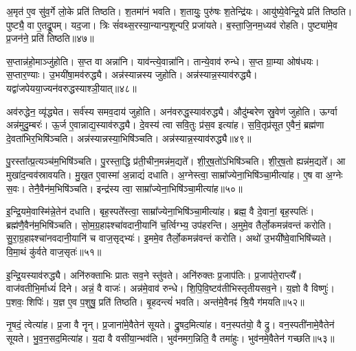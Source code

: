 अ॒मृत॑ ए॒व सु॑व॒र्गे लो॒के प्रति॑ तिष्ठति।
श॒तमा॑नं भवति।
श॒तायुः॒ पुरु॑षः श॒तेन्द्रि॑यः।
आयु॑ष्ये॒वेन्द्रि॒ये प्रति॑ तिष्ठति।
पुष्ट्यै॒ वा ए॒तद्रू॒पम्।
यद॒जा।
त्रिः सं॑वथ्स॒रस्या॒न्यान्प॒शून्परि॒ प्रजा॑यते।
ब॒स्ता॒जि॒नम॒ध्यव॑ रोहति।
पुष्ट्या॑मे॒व प्र॒जन॑ने॒ प्रति॑ तिष्ठति॥४७॥\ip\anuvakamend[प॒रि॒धा॒पय॑ति गो॒धूमा॑ जुहोति॒ स्वं नैति॑ प्र॒त्यञ्चं᳚ घ्नन्ति लो॒को नव॑ च]

स॒प्तान्न॑हो॒माञ्जु॑होति।
स॒प्त वा अन्ना॑नि।
याव॑न्त्ये॒वान्ना॑नि।
तान्ये॒वाव॑ रुन्धे।
स॒प्त ग्रा॒म्या ओष॑धयः।
स॒प्तार॒ण्याः।
उ॒भयी॑षा॒मव॑रुद्ध्यै।
अन्न॑स्यान्नस्य जुहोति।
अन्न॑स्यान्न॒स्या\-व॑रुद्ध्यै।
यद्वा॑जपेयया॒ज्यन॑वरुद्धस्याश्ञी॒यात्॥४८॥\ip

अव॑रुद्धेन॒ व्यृ॑द्ध्येत।
सर्व॑स्य समव॒दाय॑ जुहोति।
अन॑वरुद्ध॒स्या\-व॑\-रुद्ध्यै।
औदु॑म्बरेण स्रु॒वेण॑ जुहोति।
ऊर्ग्वा अन्न॑मुदु॒म्बरः॑।
ऊ॒र्ज ए॒वान्नाद्य॒स्या\-व॑\-रुद्ध्यै।
दे॒वस्य॑ त्वा सवि॒तुः प्र॑स॒व इत्या॑ह।
स॒वि॒तृप्र॑सूत ए॒वैनं॒ ब्रह्म॑णा दे॒वता॑भिर॒भिषि॑ञ्चति।
अन्न॑स्यान्नस्या॒भिषि॑ञ्चति।
अन्न॑स्यान्न॒स्या\-व॑\-रुद्ध्यै॥४९॥\ip

पु॒रस्ता᳚त्प्र॒त्यञ्च॑म॒भिषि॑ञ्चति।
पु॒रस्ता॒द्धि प्र॑ती॒चीन॒मन्न॑म॒द्यते᳚।
शी॒र्॒ष॒तो॑\-ऽभिषि॑ञ्चति।
शी॒र्॒ष॒तो ह्यन्न॑म॒द्यते᳚।
आ मुखा॑द॒न्वव॑\-स्रावयति।
मु॒ख॒त ए॒वास्मा॑ अ॒न्नाद्यं॑ दधाति।
अ॒ग्नेस्त्वा॒ साम्रा᳚ज्येना॒\-भिषि॑ञ्चा॒मी\-त्या॑ह।
ए॒ष वा अ॒ग्नेः स॒वः।
तेनै॒वैन॑म॒भि\-षि॑ञ्चति।
इन्द्र॑स्य त्वा॒ साम्रा᳚ज्येना॒\-भिषि॑ञ्चा॒मी\-त्या॑ह॥५०॥\ip

इ॒न्द्रि॒यमे॒वास्मि॑न्ने॒तेन॑ दधाति।
बृह॒स्पते᳚स्त्वा॒ साम्रा᳚ज्येना॒भि\-षि॑ञ्चा॒मीत्या॑ह।
ब्रह्म॒ वै दे॒वानां॒ बृह॒स्पतिः॑।
ब्रह्म॑णै॒वैन॑म॒भि\-षि॑ञ्चति।
सो॒म॒ग्र॒हाꣴश्चा॑वदानी॒यानि॑ च॒र्त्विग्भ्य॒ उप॑हरन्ति।
अ॒मुमे॒व तैर्लो॒कमन्न॑वन्तं करोति।
सु॒रा॒ग्र॒हाꣴश्चा॑नवदानी॒\-यानि॑ च वाज॒सृद्भ्यः॑।
इ॒ममे॒व तैर्लो॒कमन्न॑वन्तं करोति।
अथो॑ उ॒भयी᳚ष्वे॒वाभिषि॑च्यते।
वि॒मा॒थं कु॑र्वते वाज॒सृतः॑॥५१॥\ip

इ॒न्द्रि॒यस्या\-व॑\-रुद्ध्यै।
अनि॑रुक्ताभिः प्रातः सव॒ने स्तु॑वते।
अनि॑रुक्तः प्र॒जा\-प॑तिः।
प्र॒जा\-प॑ते॒राप्त्यै᳚।
वाज॑वतीभि॒र्माध्यं॑ दिने।
अन्नं॒ वै वाजः॑।
अन्न॑मे॒वाव॑ रुन्धे।
शि॒पि॒वि॒ष्ट\-व॑तीभिस्तृतीयसव॒ने।
य॒ज्ञो वै विष्णुः॑।
प॒शवः॒ शिपिः॑।
य॒ज्ञ ए॒व प॒शुषु॒ प्रति॑ तिष्ठति।
बृ॒हदन्त्यं॑ भवति।
अन्त॑मे॒वैनꣴ॑ श्रि॒यै ग॑मयति॥५२॥\ip\anuvakamend[अ॒श्ञी॒यादन्न॑स्यान्न॒स्याव॑रुद्ध्या॒ इन्द्र॑स्य त्वा॒ साम्रा᳚ज्येना॒भिषि॑ञ्चा॒मीत्या॑ह वाज॒सृतः॒ शिपि॒स्त्रीणि॑ च]

नृ॒षदं॒ त्वेत्या॑ह।
प्र॒जा वै नॄन्।
प्र॒जाना॑मे॒वैतेन॑ सूयते।
द्रु॒षद॒मित्या॑ह।
वन॒स्पत॑यो॒ वै द्रु।
वन॒स्पती॑नामे॒वैतेन॑ सूयते।
भु॒व॒न॒सद॒मित्या॑ह।
य॒दा वै वसी॑या॒न्भव॑ति।
भुव॑नमग॒न्निति॒ वै तमा॑हुः।
भुव॑नमे॒वैतेन॑ गच्छति॥५३॥\ip

